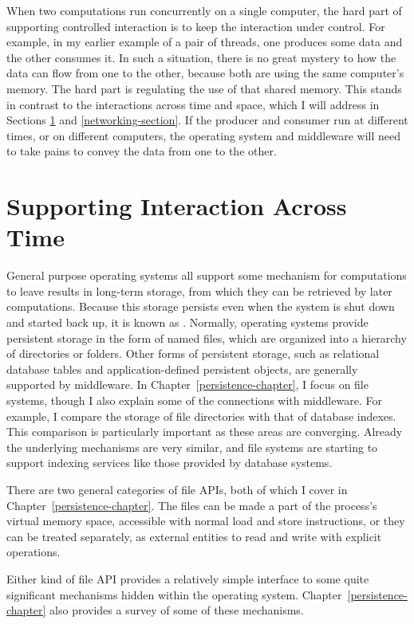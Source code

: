 When two computations run concurrently on a single computer, the hard
part of supporting controlled interaction is to keep the interaction
under control.  For example, in my earlier example of a
pair of threads, one produces some data and the other consumes it.
In such a situation, there is no great mystery to how the data can flow from one to the
other, because both are using the same computer's memory.  The hard
part is regulating the use of that shared memory.  This stands in
contrast to the interactions across time and space, which I will address in Sections
\ref{persistence-section} and \ref{networking-section}.  If the producer and consumer run
at different times, or on different computers, the operating system
and middleware will need to take pains to convey the data from one to
the other.

\section{Supporting Interaction Across Time}\label{persistence-section}

General purpose operating systems all support some mechanism for
computations to leave results in long-term storage, from which they can be
retrieved by later computations.  Because this storage persists even
when the system is shut down and started back up, it is known as
.  Normally, operating systems provide
persistent storage in the form of named files, which are organized into a
hierarchy of directories or folders.  Other forms of persistent
storage, such as relational database tables and application-defined
persistent objects, are generally supported by middleware.  In
Chapter~\ref{persistence-chapter}, I focus on file systems, though I
also explain some of the connections with middleware.  For example, I
compare the storage of file directories with that of database
indexes.  This comparison is particularly important as these areas are
converging.  Already the underlying mechanisms are very similar, and
file systems are starting to support indexing services like
those provided by database systems.

There are two general categories of file APIs, both of which I cover
in Chapter~\ref{persistence-chapter}.  The files can be made a part of
the process's virtual memory space, accessible with normal load and
store instructions, or they can be treated separately, as external
entities to read and write with explicit operations.

Either kind of file API provides a relatively simple interface to some
quite significant mechanisms hidden within the operating system.
Chapter~\ref{persistence-chapter} also provides a survey of some of
these mechanisms.

